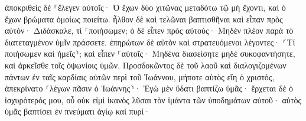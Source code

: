 \documentclass{openreader}
\begin{document}
ἀποκριθεὶς δὲ ⸀ἔλεγεν αὐτοῖς· Ὁ ἔχων δύο χιτῶνας μεταδότω τῷ μὴ ἔχοντι, καὶ ὁ ἔχων βρώματα ὁμοίως ποιείτω. 
ἦλθον δὲ καὶ τελῶναι βαπτισθῆναι καὶ εἶπαν πρὸς αὐτόν· Διδάσκαλε, τί ⸀ποιήσωμεν; 
ὁ δὲ εἶπεν πρὸς αὐτούς· Μηδὲν πλέον παρὰ τὸ διατεταγμένον ὑμῖν πράσσετε. 
ἐπηρώτων δὲ αὐτὸν καὶ στρατευόμενοι λέγοντες· ⸂Τί ποιήσωμεν καὶ ἡμεῖς⸃; καὶ εἶπεν ⸀αὐτοῖς· Μηδένα διασείσητε μηδὲ συκοφαντήσητε, καὶ ἀρκεῖσθε τοῖς ὀψωνίοις ὑμῶν. 
Προσδοκῶντος δὲ τοῦ λαοῦ καὶ διαλογιζομένων πάντων ἐν ταῖς καρδίαις αὐτῶν περὶ τοῦ Ἰωάννου, μήποτε αὐτὸς εἴη ὁ χριστός, 
ἀπεκρίνατο ⸂λέγων πᾶσιν ὁ Ἰωάννης⸃· Ἐγὼ μὲν ὕδατι βαπτίζω ὑμᾶς· ἔρχεται δὲ ὁ ἰσχυρότερός μου, οὗ οὐκ εἰμὶ ἱκανὸς λῦσαι τὸν ἱμάντα τῶν ὑποδημάτων αὐτοῦ· αὐτὸς ὑμᾶς βαπτίσει ἐν πνεύματι ἁγίῳ καὶ πυρί· 
\end{document}
